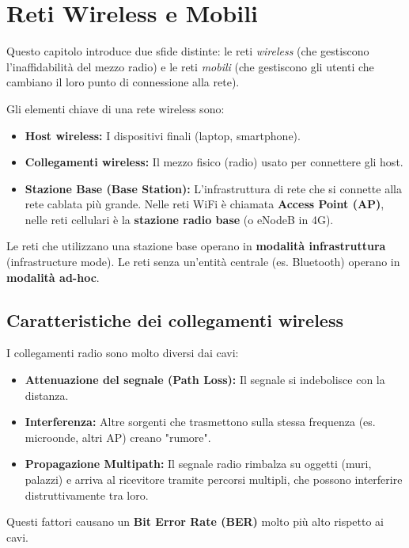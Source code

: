 \section{Reti Wireless e Mobili}
Questo capitolo introduce due sfide distinte: le reti \textit{wireless} (che gestiscono l'inaffidabilità del mezzo radio) e le reti \textit{mobili} (che gestiscono gli utenti che cambiano il loro punto di connessione alla rete).

\noindent Gli elementi chiave di una rete wireless sono:
\begin{itemize}
    \item \textbf{Host wireless:} I dispositivi finali (laptop, smartphone).
    \item \textbf{Collegamenti wireless:} Il mezzo fisico (radio) usato per connettere gli host.
    \item \textbf{Stazione Base (Base Station):} L'infrastruttura di rete che si connette alla rete cablata più grande. Nelle reti WiFi è chiamata \textbf{Access Point (AP)}, nelle reti cellulari è la \textbf{stazione radio base} (o eNodeB in 4G).
\end{itemize}
Le reti che utilizzano una stazione base operano in \textbf{modalità infrastruttura} (infrastructure mode). Le reti senza un'entità centrale (es. Bluetooth) operano in \textbf{modalità ad-hoc}.

\subsection{Caratteristiche dei collegamenti wireless}
I collegamenti radio sono molto diversi dai cavi:
\begin{itemize}
    \item \textbf{Attenuazione del segnale (Path Loss):} Il segnale si indebolisce con la distanza.
    \item \textbf{Interferenza:} Altre sorgenti che trasmettono sulla stessa frequenza (es. microonde, altri AP) creano "rumore".
    \item \textbf{Propagazione Multipath:} Il segnale radio rimbalza su oggetti (muri, palazzi) e arriva al ricevitore tramite percorsi multipli, che possono interferire distruttivamente tra loro.
\end{itemize}
Questi fattori causano un \textbf{Bit Error Rate (BER)} molto più alto rispetto ai cavi.

